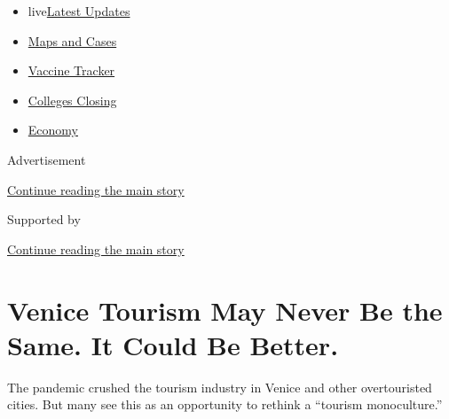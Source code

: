 \begin{itemize}
\tightlist
\item
  live\href{https://www.nytimes3xbfgragh.onion/2020/08/21/world/covid-19-coronavirus.html?name=styln-coronavirus-national\&region=TOP_BANNER\&variant=undefined\&block=storyline_menu_recirc\&action=click\&pgtype=Article\&impression_id=63cae080-e3b4-11ea-81b0-ed0ce085a510}{Latest
  Updates}
\item
  \href{https://www.nytimes3xbfgragh.onion/interactive/2020/us/coronavirus-us-cases.html?name=styln-coronavirus-national\&region=TOP_BANNER\&variant=undefined\&block=storyline_menu_recirc\&action=click\&pgtype=Article\&impression_id=63cae081-e3b4-11ea-81b0-ed0ce085a510}{Maps
  and Cases}
\item
  \href{https://www.nytimes3xbfgragh.onion/interactive/2020/science/coronavirus-vaccine-tracker.html?name=styln-coronavirus-national\&region=TOP_BANNER\&variant=undefined\&block=storyline_menu_recirc\&action=click\&pgtype=Article\&impression_id=63cae082-e3b4-11ea-81b0-ed0ce085a510}{Vaccine
  Tracker}
\item
  \href{https://www.nytimes3xbfgragh.onion/2020/08/19/us/colleges-closing-covid.html?name=styln-coronavirus-national\&region=TOP_BANNER\&variant=undefined\&block=storyline_menu_recirc\&action=click\&pgtype=Article\&impression_id=63cae083-e3b4-11ea-81b0-ed0ce085a510}{Colleges
  Closing}
\item
  \href{https://www.nytimes3xbfgragh.onion/live/2020/08/21/business/stock-market-today-coronavirus?name=styln-coronavirus-national\&region=TOP_BANNER\&variant=undefined\&block=storyline_menu_recirc\&action=click\&pgtype=Article\&impression_id=63cae084-e3b4-11ea-81b0-ed0ce085a510}{Economy}
\end{itemize}

Advertisement

\protect\hyperlink{after-top}{Continue reading the main story}

Supported by

\protect\hyperlink{after-sponsor}{Continue reading the main story}

\hypertarget{venice-tourism-may-never-be-the-same-it-could-be-better}{%
\section{Venice Tourism May Never Be the Same. It Could Be
Better.}\label{venice-tourism-may-never-be-the-same-it-could-be-better}}

The pandemic crushed the tourism industry in Venice and other
overtouristed cities. But many see this as an opportunity to rethink a
``tourism monoculture.''

